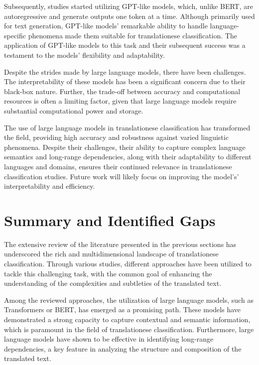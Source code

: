 Subsequently, studies started utilizing GPT-like models, which, unlike BERT, are autoregressive and generate outputs one token at a time. Although primarily used for text generation, GPT-like models' remarkable ability to handle language-specific phenomena made them suitable for translationese classification. The application of GPT-like models to this task and their subsequent success was a testament to the models' flexibility and adaptability.

Despite the strides made by large language models, there have been challenges. The interpretability of these models has been a significant concern due to their black-box nature. Further, the trade-off between accuracy and computational resources is often a limiting factor, given that large language models require substantial computational power and storage.

The use of large language models in translationese classification has transformed the field, providing high accuracy and robustness against varied linguistic phenomena. Despite their challenges, their ability to capture complex language semantics and long-range dependencies, along with their adaptability to different languages and domains, ensures their continued relevance in translationese classification studies. Future work will likely focus on improving the model's' interpretability and efficiency.


\section{Summary and Identified Gaps}

The extensive review of the literature presented in the previous sections has underscored the rich and multidimensional landscape of translationese classification. Through various studies, different approaches have been utilized to tackle this challenging task, with the common goal of enhancing the understanding of the complexities and subtleties of the translated text.

Among the reviewed approaches, the utilization of large language models, such as Transformers or BERT\cite{BERT}, has emerged as a promising path. These models have demonstrated a strong capacity to capture contextual and semantic information, which is paramount in the field of translationese classification. Furthermore, large language models have shown to be effective in identifying long-range dependencies, a key feature in analyzing the structure and composition of the translated text.

